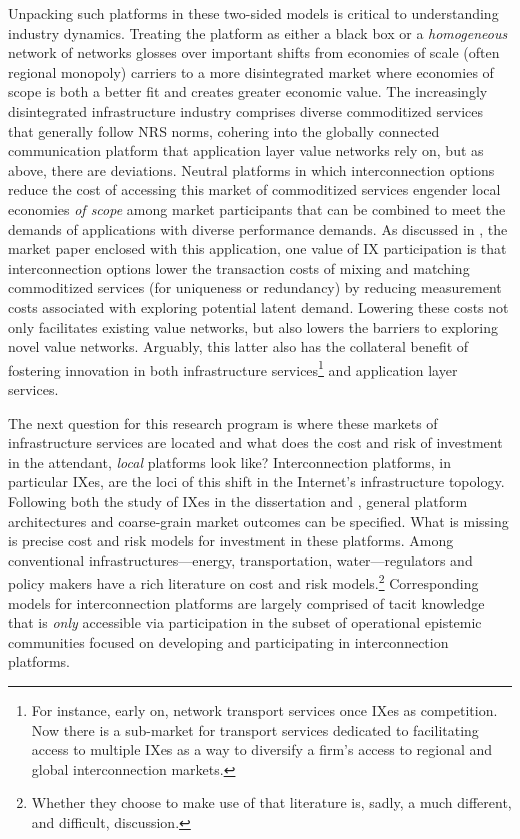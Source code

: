 \documentclass[12pt,journal,compsoc,letterpaper,onecolumn,twoside]{IEEEtran}
\begin{document}
Unpacking such platforms in these two-sided models is critical to
understanding industry dynamics.
% 
Treating the platform as either a black box or a
\emph{homogeneous} network of networks glosses over important shifts from
economies of scale (often regional monopoly) carriers to a more
disintegrated market where economies of scope is both a better fit and
creates greater economic value. 
%
The increasingly
disintegrated infrastructure industry comprises diverse 
commoditized services that generally follow NRS norms, cohering into
the globally 
connected communication platform that application layer value networks rely
on, but as above, 
there are deviations.  
%
Neutral platforms in which
interconnection options reduce the cost of accessing this market of
commoditized services engender local economies \emph{of scope} among market
participants that can be combined to meet the demands of
applications with diverse performance demands.
%
As discussed in , the market paper enclosed with
this application, one value of IX participation is that
interconnection options lower the transaction costs of mixing and
matching commoditized services (for uniqueness or redundancy)  by
reducing measurement costs associated with exploring potential latent
demand.
%
Lowering these costs not only facilitates existing value networks, but
also lowers the barriers to exploring novel value networks.
%
Arguably, this latter also has the collateral benefit of fostering
innovation in both infrastructure services\footnote{For instance,
  early on, network transport services once IXes as competition.  Now
  there is a sub-market for transport services dedicated to facilitating
  access to multiple IXes as a way to diversify a firm's access to
  regional and global  interconnection markets.} and application layer services.

The next question for this research program is where these markets
of infrastructure services are located and what does the cost and risk of
investment in the attendant, \emph{local} platforms look like?
%
Interconnection platforms, in particular IXes, are the loci of this shift in
the Internet's infrastructure topology.
%
Following both the study of IXes in the dissertation and
, general platform architectures and
coarse-grain market outcomes can be specified.
%
What is missing is precise cost and risk models for investment in
these platforms.
%
Among conventional infrastructures---energy, transportation,
water---regulators and policy makers have a rich literature on cost
and risk models.\footnote{Whether they choose to make use of that
  literature is, sadly, a much different, and difficult, discussion.}
%
Corresponding models for interconnection platforms are largely
comprised of tacit
knowledge that is \emph{only} accessible via participation in the subset of
operational epistemic communities focused on developing and
participating in interconnection platforms.
%
\end{document}
